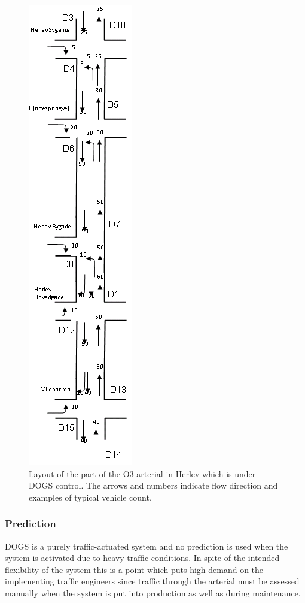 \begin{figure}[!ht]
\begin{center}
\includegraphics[scale=0.5,angle=90]{dogs_herlev.png} 
\end{center}
\caption{Layout of the part of the O3 arterial in Herlev which is under DOGS control. The arrows and numbers indicate flow direction and examples of typical vehicle count.}
\label{fig:dogs_herlev}
\end{figure}

\subsubsection*{Prediction}

DOGS is a purely traffic-actuated system and no prediction is used
when the system is activated due to heavy traffic conditions.  In
spite of the intended flexibility of the system this is a point which
puts high demand on the implementing traffic engineers since traffic
through the arterial must be assessed manually when the system is put
into production as well as during maintenance.

